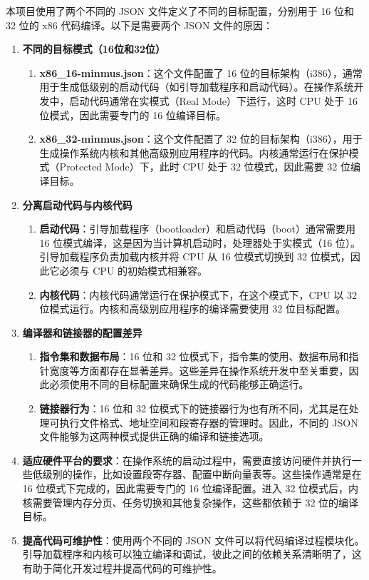 本项目使用了两个不同的 JSON 文件定义了不同的目标配置，分别用于 16 位和 32 位的 x86 代码编译。以下是需要两个 JSON 文件的原因：

\begin{enumerate}
    \item \textbf{不同的目标模式（16位和32位）}
          \begin{enumerate}
              \item \textbf{x86\_16-minmus.json}：这个文件配置了 16 位的目标架构（i386），通常用于生成低级别的启动代码（如引导加载程序和启动代码）。在操作系统开发中，启动代码通常在实模式（Real Mode）下运行，这时 CPU 处于 16 位模式，因此需要专门的 16 位编译目标。
              \item \textbf{x86\_32-minmus.json}：这个文件配置了 32 位的目标架构（i386），用于生成操作系统内核和其他高级别应用程序的代码。内核通常运行在保护模式（Protected Mode）下，此时 CPU 处于 32 位模式，因此需要 32 位编译目标。
          \end{enumerate}
    \item \textbf{分离启动代码与内核代码}
          \begin{enumerate}
              \item \textbf{启动代码}：引导加载程序（bootloader）和启动代码（boot）通常需要用 16 位模式编译，这是因为当计算机启动时，处理器处于实模式（16 位）。引导加载程序负责加载内核并将 CPU 从 16 位模式切换到 32 位模式，因此它必须与 CPU 的初始模式相兼容。
              \item \textbf{内核代码}：内核代码通常运行在保护模式下，在这个模式下，CPU 以 32 位模式运行。内核和高级别应用程序的编译需要使用 32 位目标配置。
          \end{enumerate}
    \item \textbf{编译器和链接器的配置差异}
          \begin{enumerate}
              \item \textbf{指令集和数据布局}：16 位和 32 位模式下，指令集的使用、数据布局和指针宽度等方面都存在显著差异。这些差异在操作系统开发中至关重要，因此必须使用不同的目标配置来确保生成的代码能够正确运行。
              \item \textbf{链接器行为}：16 位和 32 位模式下的链接器行为也有所不同，尤其是在处理可执行文件格式、地址空间和段寄存器的管理时。因此，不同的 JSON 文件能够为这两种模式提供正确的编译和链接选项。
          \end{enumerate}
    \item \textbf{适应硬件平台的要求}：在操作系统的启动过程中，需要直接访问硬件并执行一些低级别的操作，比如设置段寄存器、配置中断向量表等。这些操作通常是在 16 位模式下完成的，因此需要专门的 16 位编译配置。进入 32 位模式后，内核需要管理内存分页、任务切换和其他复杂操作，这些都依赖于 32 位的编译目标。
    \item \textbf{提高代码可维护性}：使用两个不同的 JSON 文件可以将代码编译过程模块化。引导加载程序和内核可以独立编译和调试，彼此之间的依赖关系清晰明了，这有助于简化开发过程并提高代码的可维护性。
\end{enumerate}

